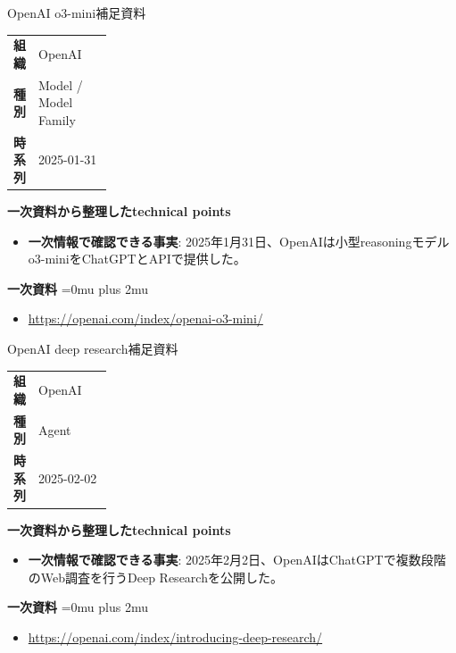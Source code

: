 \begin{technicalnote}{OpenAI o3-mini}{補足資料}
\begingroup
\begin{tabularx}{\linewidth}{@{}>{\bfseries}p{0.22\linewidth}X@{}}
組織 & OpenAI \\
種別 & Model / Model Family \\
時系列 & 2025-01-31 \\
\end{tabularx}
\smallskip
\begin{minipage}{\linewidth}
{\bfseries 一次資料から整理したtechnical points}
\begin{itemize}[leftmargin=1.5em,itemsep=0.35em]
\item \textbf{一次情報で確認できる事実}: 2025年1月31日、OpenAIは小型reasoningモデルo3-miniをChatGPTとAPIで提供した。
\end{itemize}
\begin{samepage}
{\bfseries 一次資料}
\begingroup\sloppy
\Urlmuskip=0mu plus 2mu\relax
\begin{itemize}[leftmargin=1.5em,itemsep=0.25em]
\item {\scriptsize\url{https://openai.com/index/openai-o3-mini/}}
\end{itemize}
\endgroup
\end{samepage}
\end{minipage}
\endgroup
\end{technicalnote}
\medskip

\begin{technicalnote}{OpenAI deep research}{補足資料}
\begingroup
\begin{tabularx}{\linewidth}{@{}>{\bfseries}p{0.22\linewidth}X@{}}
組織 & OpenAI \\
種別 & Agent \\
時系列 & 2025-02-02 \\
\end{tabularx}
\smallskip
\begin{minipage}{\linewidth}
{\bfseries 一次資料から整理したtechnical points}
\begin{itemize}[leftmargin=1.5em,itemsep=0.35em]
\item \textbf{一次情報で確認できる事実}: 2025年2月2日、OpenAIはChatGPTで複数段階のWeb調査を行うDeep Researchを公開した。
\end{itemize}
\begin{samepage}
{\bfseries 一次資料}
\begingroup\sloppy
\Urlmuskip=0mu plus 2mu\relax
\begin{itemize}[leftmargin=1.5em,itemsep=0.25em]
\item {\scriptsize\url{https://openai.com/index/introducing-deep-research/}}
\end{itemize}
\endgroup
\end{samepage}
\end{minipage}
\endgroup
\end{technicalnote}
\medskip

